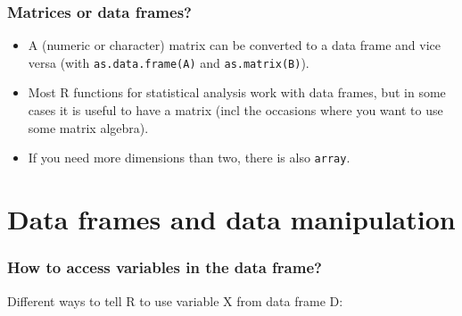\documentclass{beamer}
\newcommand{\code}[1]{\texttt{#1}}
\let\overbatim\verbatim
\let\endoverbatim\endverbatim
\newenvironment{vcode}%
{\bgroup\baselineskip=0.8\baselineskip\overbatim}%
{\endoverbatim\egroup}
\begin{document}
\begin{frame}[fragile]
  \frametitle{Matrices or data frames?}
  \begin{itemize}
\item A (numeric or character) matrix can be converted to a data frame and vice versa (with \code{as.data.frame(A)} and \code{as.matrix(B)}).
\item  Most R functions for statistical analysis work with data frames, but in some cases it is useful to have a matrix (incl the occasions where you want to use some matrix algebra).  
\item If you need more dimensions than two, there is also \code{array}. 
  \end{itemize}
\end{frame}


\section{Data frames and data manipulation}
\begin{frame}[fragile] 
\frametitle{How to access variables in the data frame?} 
Different ways to tell R to use variable X from data frame D: 
\end{frame}
\end{document}
